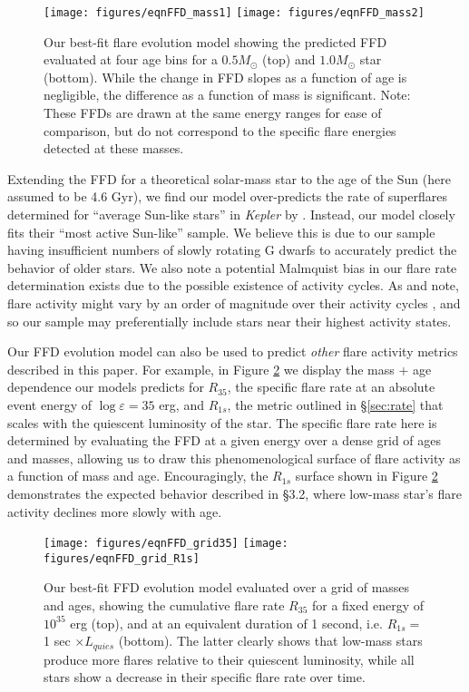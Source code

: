 \documentclass[preprint2]{aastex62}
\newcommand{\Kepler}{\textsl{Kepler}\xspace}
\begin{document}
\begin{figure}[!t]
\centering
\texttt{[image: figures/eqnFFD\_mass1]}
\texttt{[image: figures/eqnFFD\_mass2]}
\caption{
Our best-fit flare evolution model showing the predicted FFD evaluated at four age bins for a $0.5 M_\odot$ (top) and $1.0 M_\odot$ star (bottom). While the change in FFD slopes as a function of age is negligible, the difference as a function of mass is significant. Note: These FFDs are drawn at the same energy ranges for ease of comparison, but do not correspond to the specific flare energies detected at these masses.
}
\label{fig:model}
\end{figure}




Extending the FFD for a theoretical solar-mass star to the age of the Sun (here assumed to be 4.6 Gyr), we find our model over-predicts the rate of superflares determined for ``average Sun-like stars'' in \Kepler by \citet{shibayama2013}. Instead, our model closely fits their ``most active Sun-like'' sample. We believe this is due to our sample having insufficient numbers of slowly rotating G dwarfs to accurately predict the behavior of older stars. We also note a potential Malmquist bias in our flare rate determination exists due to the possible existence of activity cycles. As \citet{shibayama2013} and \citet{clarke2018} note, flare activity might vary by an order of magnitude over their activity cycles \citep[see also][]{veronig2002}, and so our sample may preferentially include stars near their highest activity states.





Our FFD evolution model can also be used to predict {\it other} flare activity metrics described in this paper. For example, in Figure \ref{fig:grid} we display the mass + age dependence our models predicts for $R_{35}$, the specific flare rate at an absolute event energy of $\log \varepsilon = 35$ erg, and $R_{1s}$, the metric outlined in \S\ref{sec:rate} that scales with the quiescent luminosity of the star. The specific flare rate here is determined by evaluating the FFD at a given energy over a dense grid of ages and masses, allowing us to draw this phenomenological surface of flare activity as a function of mass and age. 
Encouragingly, the $R_{1s}$ surface shown in Figure \ref{fig:grid} demonstrates the expected behavior described in \S3.2, where low-mass star's flare activity declines more slowly with age.


\begin{figure}[!t]
\centering
\texttt{[image: figures/eqnFFD\_grid35]}
\texttt{[image: figures/eqnFFD\_grid\_R1s]}
\caption{
Our best-fit FFD evolution model evaluated over a grid of masses and ages, showing the cumulative flare rate $R_{35}$ for a fixed energy of $10^35$ erg (top), and at an equivalent duration of 1 second, i.e. $R_{1s} = $ 1 sec $\times L_{quies}$ (bottom). The latter clearly shows that low-mass stars produce more flares relative to their quiescent luminosity, while all stars show a decrease in their specific flare rate over time.
}
\label{fig:grid}
\end{figure}
\end{document}
